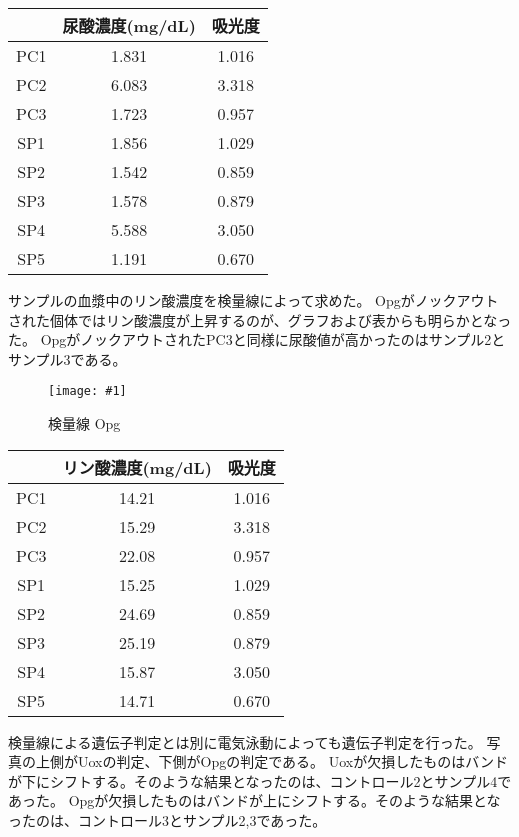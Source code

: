 \documentclass[a4paper,papersize,dvipdfmx]{jsarticle}
\newcommand{\piccap}[3]{\begin{figure}[H] \centering \texttt{[image: \#1]} \caption{#3} \label{fig {#1}} \end{figure}} %
\begin{document}
\begin{table}[H]
\begin{center}
\begin{tabular}{|c|c|c|}
  \hline
& 尿酸濃度(mg/dL) & 吸光度        \\ \hline
PC1         & 1.831 & 1.016 \\ \hline
PC2         & 6.083 & 3.318 \\ \hline
PC3         & 1.723 & 0.957 \\ \hline
SP1         & 1.856 & 1.029 \\ \hline
SP2         & 1.542 & 0.859 \\ \hline
SP3         & 1.578 & 0.879 \\ \hline
SP4         & 5.588 & 3.050 \\ \hline
SP5         & 1.191 & 0.670
\\ \hline
\end{tabular}
\end{center}
\end{table}

サンプルの血漿中のリン酸濃度を検量線によって求めた。
Opgがノックアウトされた個体ではリン酸濃度が上昇するのが、グラフおよび表からも明らかとなった。
OpgがノックアウトされたPC3と同様に尿酸値が高かったのはサンプル2とサンプル3である。

\piccap{images/graph-opg.png}{10}{検量線 Opg}

\begin{table}[H]
\begin{center}
\begin{tabular}{|c|c|c|}
  \hline
& リン酸濃度(mg/dL) & 吸光度    \\ \hline
PC1         & 14.21 & 1.016 \\ \hline
PC2         & 15.29 & 3.318 \\ \hline
PC3         & 22.08 & 0.957 \\ \hline
SP1         & 15.25 & 1.029 \\ \hline
SP2         & 24.69 & 0.859 \\ \hline
SP3         & 25.19 & 0.879 \\ \hline
SP4         & 15.87 & 3.050 \\ \hline
SP5         & 14.71 & 0.670
\\ \hline
\end{tabular}
\end{center}
\end{table}

検量線による遺伝子判定とは別に電気泳動によっても遺伝子判定を行った。
写真の上側がUoxの判定、下側がOpgの判定である。
Uoxが欠損したものはバンドが下にシフトする。そのような結果となったのは、コントロール2とサンプル4であった。
Opgが欠損したものはバンドが上にシフトする。そのような結果となったのは、コントロール3とサンプル2,3であった。
\end{document}
